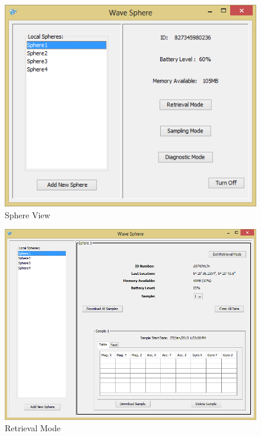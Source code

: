 \begin{figure}[H]
	\centering
	\includegraphics[scale=0.7]{img/viewSphere}
	\caption{Sphere View \label{fig:viewSphere}}
\end{figure}

\begin{figure}[H]
	\centering
	\includegraphics[scale=0.7]{img/retrievalMode}
	\caption{Retrieval Mode \label{fig:retrievalMode}}
\end{figure}

